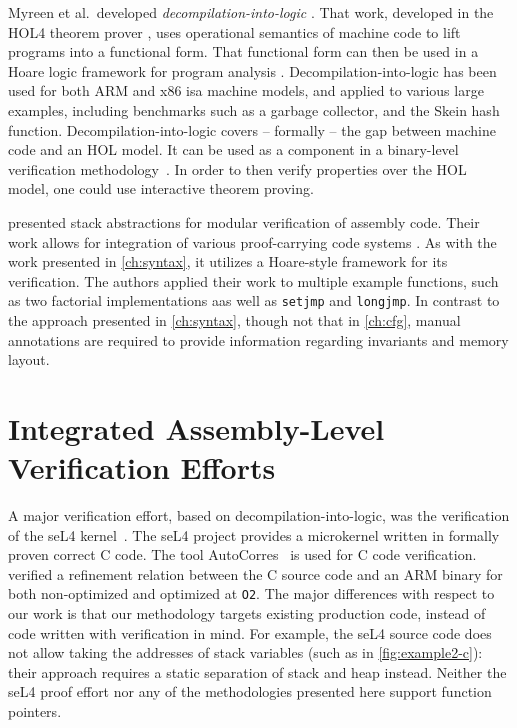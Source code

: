 Myreen et al.\ developed \emph{decompilation-into-logic} \citep{myreen2007hoare,myreen2008decompilation,myreen2012decompilation}.
That work, developed in the HOL4 theorem prover \citep{slind2008brief},
uses operational semantics of machine code to lift programs into a functional form.
That functional form can then be used in a Hoare logic framework for program analysis \citep{myreen2007hoare}.
Decompilation-into-logic has been used for both ARM and x86 \ac{isa} machine models, and applied to various large examples, including benchmarks such as a garbage collector, and the Skein hash function.
Decompilation-into-logic covers -- formally -- the gap between machine code
and an HOL model.
It can be used as a component
in a binary-level verification methodology~\citep{sewell2013tvv}.
In order to then verify properties over the HOL model,
one could use interactive theorem proving.

\citet{feng2006modular,feng2005sbca} presented stack abstractions
for modular verification of assembly code. %
Their work allows for integration
of various proof-carrying code systems \citep{necula1997proof}.
As with the work presented in \cref{ch:syntax},
it utilizes a Hoare-style framework for its verification.
The authors applied their work to multiple example functions,
such as two factorial implementations
aas well as \lstinline[language=C]|setjmp| and \lstinline[language=C]|longjmp|.
In contrast to the approach presented in \cref{ch:syntax},
though not that in \cref{ch:cfg},
manual annotations are required to provide information regarding invariants and memory layout.

\section{Integrated Assembly-Level Verification Efforts}
A major verification effort, based on decompilation-into-logic,
was the verification of the seL4 kernel~\citep{klein2009sel4,Klein_AEMSKH_14}.
The seL4 project provides a microkernel written in formally proven correct C code.
The tool AutoCorres~\citep{greenaway2012bridging} is used for C code verification.
\citet{sewell2013tvv} verified a refinement relation between the C source code
and an ARM binary for both non-optimized and optimized at \lstinline{O2}.
The major differences with respect to our work
is that our methodology targets existing production code,
instead of code written with verification in mind.
For example, the seL4 source code does not allow taking the addresses of stack variables
(such as in \cref{fig:example2-c}):
their approach requires a static separation of stack and heap instead.
Neither the seL4 proof effort nor any of the methodologies presented here
support function pointers.

